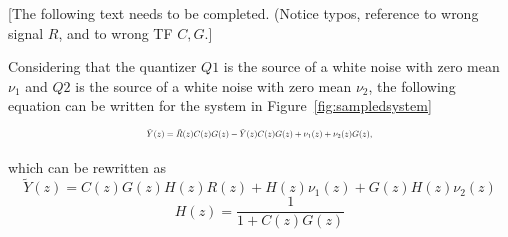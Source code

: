 \documentclass{sig-alternate-05-2015}
\newcommand{\red}[1]{{\color{red}#1}}
\begin{document}
%

\red{[The following text needs to be completed. (Notice typos, reference to wrong signal $R$, and to wrong TF $C,G$.]}

Considering that
the quantizer $Q1$ is the source of a white noise with zero mean $\nu_{1}$
and $Q2$ is the source of a white noise with zero mean $\nu_{2}$, the
following equation can be written for the system in
Figure~\ref{fig:sampledsystem}
%
\begin{equation}
\resizebox{0.48\textwidth}{!}{
$\tilde{Y}(z)=\tilde R(z)C(z)G(z)-\tilde{Y}(z)C(z)G(z)+\nu_{1}(z)+\nu_{2}(z)G(z),$
}
\end{equation}

\noindent which can be rewritten as
%
\begin{equation}
\label{eq:outputfunctions}
\tilde{Y}(z)=C(z)G(z)H(z)R(z)+H(z)\nu_{1}(z)+G(z)H(z)\nu_{2}(z)
\end{equation}
$$H(z)=\frac{1}{1+C(z)G(z)}$$
\end{document}
